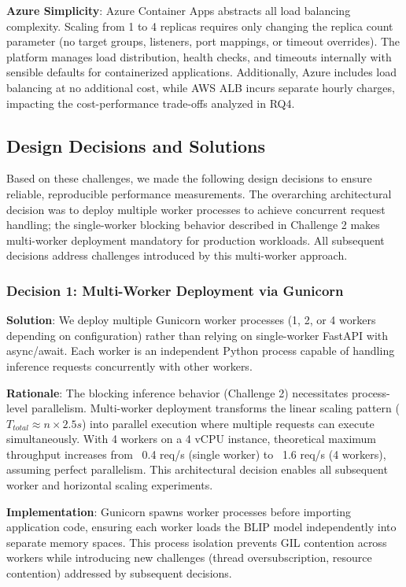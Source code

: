 \textbf{Azure Simplicity}: Azure Container Apps abstracts all load balancing complexity. Scaling from 1 to 4 replicas requires only changing the replica count parameter (no target groups, listeners, port mappings, or timeout overrides). The platform manages load distribution, health checks, and timeouts internally with sensible defaults for containerized applications. Additionally, Azure includes load balancing at no additional cost, while AWS ALB incurs separate hourly charges, impacting the cost-performance trade-offs analyzed in RQ4.

\subsection{Design Decisions and Solutions}

Based on these challenges, we made the following design decisions to ensure reliable, reproducible performance measurements. The overarching architectural decision was to deploy multiple worker processes to achieve concurrent request handling; the single-worker blocking behavior described in Challenge 2 makes multi-worker deployment mandatory for production workloads. All subsequent decisions address challenges introduced by this multi-worker approach.

\subsubsection{Decision 1: Multi-Worker Deployment via Gunicorn}

\textbf{Solution}: We deploy multiple Gunicorn worker processes (1, 2, or 4 workers depending on configuration) rather than relying on single-worker FastAPI with async/await. Each worker is an independent Python process capable of handling inference requests concurrently with other workers.

\textbf{Rationale}: The blocking inference behavior (Challenge 2) necessitates process-level parallelism. Multi-worker deployment transforms the linear scaling pattern ($T_{total} \approx n \times 2.5s$) into parallel execution where multiple requests can execute simultaneously. With 4 workers on a 4 vCPU instance, theoretical maximum throughput increases from ~0.4 req/s (single worker) to ~1.6 req/s (4 workers), assuming perfect parallelism. This architectural decision enables all subsequent worker and horizontal scaling experiments.

\textbf{Implementation}: Gunicorn spawns worker processes before importing application code, ensuring each worker loads the BLIP model independently into separate memory spaces. This process isolation prevents GIL contention across workers while introducing new challenges (thread oversubscription, resource contention) addressed by subsequent decisions.

